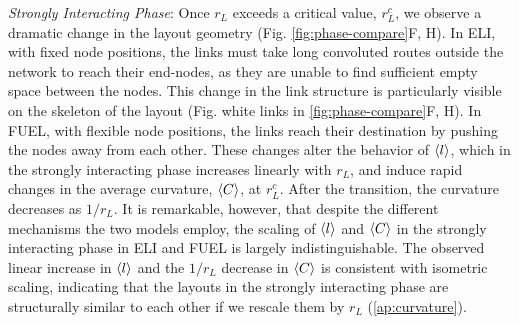 \documentclass[endfloats,nofootinbib,preprint,floatfix,titlepage,superscriptaddress,linenumbers]{revtex4-1} %
\begin{document}
{\em Strongly Interacting Phase}: Once  $r_L$ exceeds a critical value, $r_L^c$, we observe a dramatic change in the layout geometry (Fig. \ref{fig:phase-compare}F, H). 
In ELI, with fixed node positions, the links must take long convoluted routes outside the network to reach their end-nodes, as they are unable to find sufficient empty space between the nodes.  
This change in the link structure is particularly visible on the skeleton of the layout (Fig. white links in \ref{fig:phase-compare}F, H).
In FUEL, with flexible node positions, the links reach their destination by pushing the nodes away from each other. 
These changes alter the behavior of $\left<l\right>$, which in the strongly interacting phase increases linearly with $r_L$,  
and induce rapid changes in the average curvature, $\left<C\right>$,  at $r^c_L$. %
After the transition, the curvature decreases as $1/r_L$. 
It is remarkable, however, that despite the different mechanisms the two models employ, %
the scaling of $\left<l\right>$ and $\left<C\right>$ in the strongly interacting phase in ELI and FUEL is largely indistinguishable. 
The observed linear increase in $\left<l\right>$ and the $1/r_L$ decrease in $\left<C\right>$ is consistent with isometric scaling, indicating that the layouts in the strongly interacting phase are structurally similar to each other if we rescale them by $r_L$ %
(\ref{ap:curvature}). 
\end{document}
